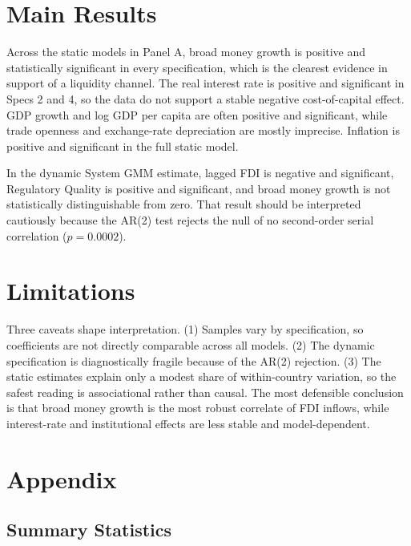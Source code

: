 \section{Main Results}
\label{sec:main-results}



Across the static models in Panel A, broad money growth is positive and statistically significant in every specification, which is the clearest evidence in support of a liquidity channel. The real interest rate is positive and significant in Specs 2 and 4, so the data do not support a stable negative cost-of-capital effect. GDP growth and log GDP per capita are often positive and significant, while trade openness and exchange-rate depreciation are mostly imprecise. Inflation is positive and significant in the full static model.

In the dynamic System GMM estimate, lagged FDI is negative and significant, Regulatory Quality is positive and significant, and broad money growth is not statistically distinguishable from zero. That result should be interpreted cautiously because the AR(2) test rejects the null of no second-order serial correlation (\(p=0.0002\)).

\section{Limitations}
\label{sec:limitations}

Three caveats shape interpretation. (1) Samples vary by specification, so coefficients are not directly comparable across all models. (2) The dynamic specification is diagnostically fragile because of the AR(2) rejection. (3) The static estimates explain only a modest share of within-country variation, so the safest reading is associational rather than causal. The most defensible conclusion is that broad money growth is the most robust correlate of FDI inflows, while interest-rate and institutional effects are less stable and model-dependent.

\section*{Appendix}
\label{app:appendix}

\subsection{Summary Statistics}
\label{app:summary-stats}


